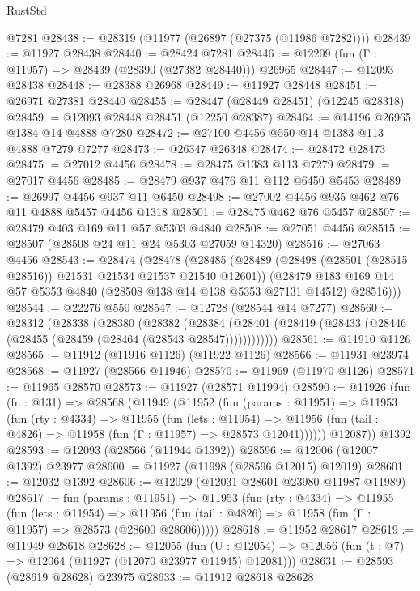 \begin{lexlean}{RustStd}
\begin{coremodule}
    @7281
@28438 := @28319 (@11977 (@26897 (@27375 (@11986 @7282))))
@28439 := @11927 @28438
@28440 := @28424 @7281
@28446 := @12209 (fun (Γ : @11957) => @28439 (@28390 (@27382 @28440))) @26965
@28447 := @12093 @28438
@28448 := @28388 @26968
@28449 := @11927 @28448
@28451 := @26971 @27381 @28440
@28455 := @28447 (@28449 @28451) (@12245 @28318)
@28459 := @12093 @28448 @28451 (@12250 @28387)
@28464 := @14196 @26965 @1384 @14 @4888 @7280
@28472 := @27100 @4456 @550 @14 @1383 @113 @4888 @7279 @7277
@28473 := @26347 @26348
@28474 := @28472 @28473
@28475 := @27012 @4456
@28478 := @28475 @1383 @113 @7279
@28479 := @27017 @4456
@28485 := @28479 @937 @476 @11 @112 @6450 @5453
@28489 := @26997 @4456 @937 @11 @6450
@28498 := @27002 @4456 @935 @462 @76 @11 @4888 @5457 @4456 @1318
@28501 := @28475 @462 @76 @5457
@28507 := @28479 @403 @169 @11 @57 @5303 @4840
@28508 := @27051 @4456
@28515 := @28507 (@28508 @24 @11 @24 @5303 @27059 @14320)
@28516 := @27063 @4456
@28543 := @28474
    (@28478
      (@28485
        (@28489 (@28498 (@28501 (@28515 @28516)) @21531 @21534 @21537 @21540 @12601))
        (@28479 @183 @169 @14 @57 @5353 @4840 (@28508 @138 @14 @138 @5353 @27131 @14512) @28516)))
@28544 := @22276 @550
@28547 := @12728 (@28544 @14 @7277)
@28560 := @28312
    (@28338
      (@28380
        (@28382
          (@28384 (@28401 (@28419 (@28433 (@28446 (@28455 (@28459 (@28464 (@28543 @28547))))))))))))
@28561 := @11910 @1126
@28565 := @11912 (@11916 @1126) (@11922 @1126)
@28566 := @11931 @23974
@28568 := @11927 (@28566 @11946)
@28570 := @11969 (@11970 @1126)
@28571 := @11965 @28570
@28573 := @11927 (@28571 @11994)
@28590 := @11926
    (fun (fn : @131) =>
    @28568
      (@11949
        (@11952
          (fun (params : @11951) =>
          @11953
            (fun (rty : @4334) =>
            @11955
              (fun (lets : @11954) =>
              @11956 (fun (tail : @4826) => @11958 (fun (Γ : @11957) => @28573 @12041))))))
        @12087))
    @1392
@28593 := @12093 (@28566 (@11944 @1392))
@28596 := @12006 (@12007 @1392) @23977
@28600 := @11927 (@11998 (@28596 @12015) @12019)
@28601 := @12032 @1392
@28606 := @12029 (@12031 @28601 @23980 @11987 @11989)
@28617 := fun (params : @11951) =>
  @11953
    (fun (rty : @4334) =>
    @11955
      (fun (lets : @11954) =>
      @11956 (fun (tail : @4826) => @11958 (fun (Γ : @11957) => @28573 (@28600 @28606)))))
@28618 := @11952 @28617
@28619 := @11949 @28618
@28628 := @12055
    (fun (U : @12054) => @12056 (fun (t : @7) => @12064 (@11927 (@12070 @23977 @11945) @12081)))
@28631 := @28593 (@28619 @28628) @23975
@28633 := @11912 @28618 @28628

\end{coremodule}
\end{lexlean}

